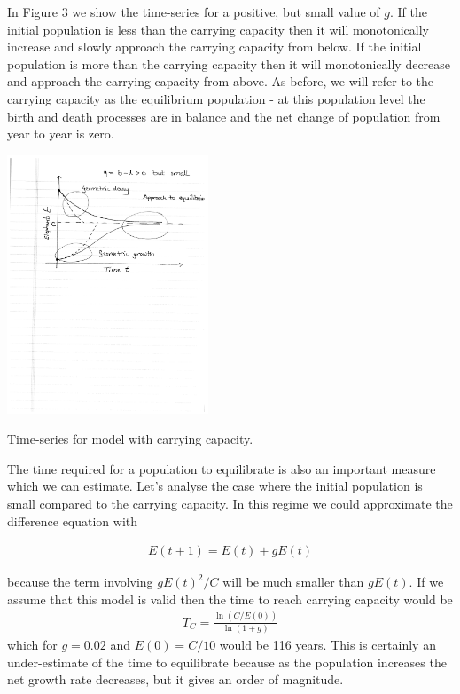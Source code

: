 \documentclass{tufte-handout}
\begin{document}
In Figure 3 we show the time-series for a positive, but small value of $g$. If the initial population is less than the carrying capacity then it will monotonically increase and slowly approach the carrying capacity from below. If the initial population is more than the carrying capacity then it will monotonically decrease and approach the carrying capacity from above. As before, we will refer to the carrying capacity as the equilibrium population - at this population level the birth and death processes are in balance and the net change of population from year to year is zero. 

\begin{marginfigure}
\includegraphics[width=6cm]{figs/carrying_capacity}
\caption{Time-series for model with carrying capacity.}
\end{marginfigure}

The time required for a population to equilibrate is also an important measure which we can estimate. Let's analyse the case where the initial population is small compared to the carrying capacity. In this regime we could approximate the difference equation with

\begin{eqnarray*}
E(t+1) = E(t) + g E(t)
\end{eqnarray*}

because the term involving $gE(t)^2/C$ will be much smaller than $gE(t)$. If we assume that this model is valid then the time to reach carrying capacity would be
\begin{eqnarray*}
T_{C} = \frac{\ln(C/E(0))}{\ln(1+g)}
\end{eqnarray*}
which for $g= 0.02$ and $E(0) = C/10$ would be 116 years. This is certainly an under-estimate of the time to equilibrate because as the population increases the net growth rate decreases, but it gives an order of magnitude.
\end{document}
